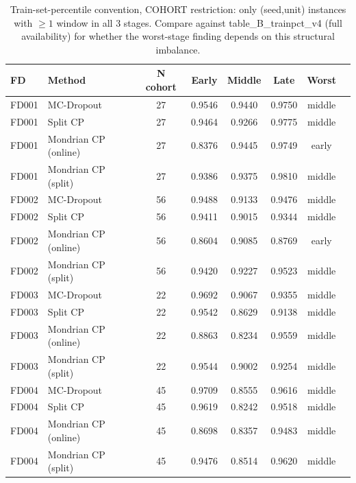 \begin{table}[t]
\caption{Train-set-percentile convention, COHORT restriction: only (seed,unit) instances with $\geq 1$ window in all 3 stages. Compare against table\_B\_trainpct\_v4 (full availability) for whether the worst-stage finding depends on this structural imbalance.}
\label{tab:trainpct-cohort-v4}
\centering
\small
\begin{tabular}{llcccccc}
\toprule
FD & Method & N cohort & Early & Middle & Late & Worst \\
\midrule
FD001 & MC-Dropout & 27 & 0.9546 & 0.9440 & 0.9750 & middle \\
FD001 & Split CP & 27 & 0.9464 & 0.9266 & 0.9775 & middle \\
FD001 & Mondrian CP (online) & 27 & 0.8376 & 0.9445 & 0.9749 & early \\
FD001 & Mondrian CP (split) & 27 & 0.9386 & 0.9375 & 0.9810 & middle \\
FD002 & MC-Dropout & 56 & 0.9488 & 0.9133 & 0.9476 & middle \\
FD002 & Split CP & 56 & 0.9411 & 0.9015 & 0.9344 & middle \\
FD002 & Mondrian CP (online) & 56 & 0.8604 & 0.9085 & 0.8769 & early \\
FD002 & Mondrian CP (split) & 56 & 0.9420 & 0.9227 & 0.9523 & middle \\
FD003 & MC-Dropout & 22 & 0.9692 & 0.9067 & 0.9355 & middle \\
FD003 & Split CP & 22 & 0.9542 & 0.8629 & 0.9138 & middle \\
FD003 & Mondrian CP (online) & 22 & 0.8863 & 0.8234 & 0.9559 & middle \\
FD003 & Mondrian CP (split) & 22 & 0.9544 & 0.9002 & 0.9254 & middle \\
FD004 & MC-Dropout & 45 & 0.9709 & 0.8555 & 0.9616 & middle \\
FD004 & Split CP & 45 & 0.9619 & 0.8242 & 0.9518 & middle \\
FD004 & Mondrian CP (online) & 45 & 0.8698 & 0.8357 & 0.9483 & middle \\
FD004 & Mondrian CP (split) & 45 & 0.9476 & 0.8514 & 0.9620 & middle \\
\bottomrule
\end{tabular}
\end{table}

